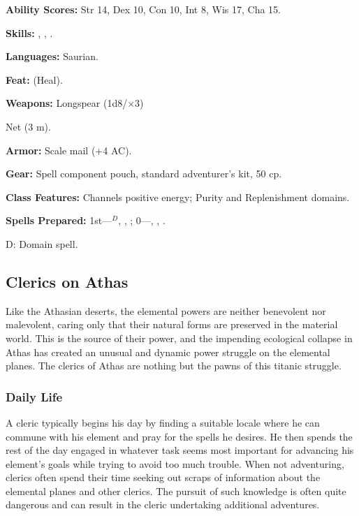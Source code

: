 \textbf{Ability Scores:} Str 14, Dex 10, Con 10, Int 8, Wis 17, Cha 15.

\textbf{Skills:} , , .

\textbf{Languages:} Saurian.

\textbf{Feat:}  (Heal).

\textbf{Weapons:} Longspear (1d8/$\times$3)

Net (3 m).

\textbf{Armor:} Scale mail (+4 AC).

\textbf{Gear:} Spell component pouch, standard adventurer's kit, 50 cp.

\textbf{Class Features:} Channels positive energy; Purity and Replenishment domains.

\textbf{Spells Prepared:} 1st---$^{D}$, , ; 0---, , .

D: Domain spell.


\subsection{Clerics on Athas}

Like the Athasian deserts, the elemental powers are neither benevolent nor malevolent, caring only that their natural forms are preserved in the material world. This is the source of their power, and the impending ecological collapse in Athas has created an unusual and dynamic power struggle on the elemental planes. The clerics of Athas are nothing but the pawns of this titanic struggle.

\subsubsection{Daily Life}
A cleric typically begins his day by finding a suitable locale where he can commune with his element and pray for the spells he desires. He then spends the rest of the day engaged in whatever task seems most important for advancing his element's goals while trying to avoid too much trouble. When not adventuring, clerics often spend their time seeking out scraps of information about the elemental planes and other clerics. The pursuit of such knowledge is often quite dangerous and can result in the cleric undertaking additional adventures.

